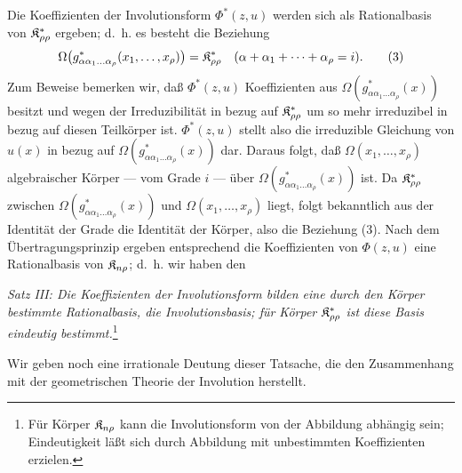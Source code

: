 Die Koeffizienten der Involutionsform $\Phi^*(z,u)$ werden sich als Rationalbasis von $\mathfrak{K}^*_{\rho\rho}$ ergeben; d.~h. es besteht die Beziehung
\begin{equation}
  \Omega\bigl(g^*_{\alpha\alpha_1\ldots\alpha_\rho}(x_1,
  \ldots,x_\rho)\bigr)=\mathfrak{K}^*_{\rho\rho}
  \quad(\alpha+\alpha_1+\cdots+\alpha_\rho=i).
\tag{3}
\end{equation}
Zum Beweise bemerken wir, daß $\Phi^*(z,u)$ Koeffizienten aus $\Omega(g^*_{\alpha\alpha_1\ldots\alpha_\rho}(x))$ besitzt und wegen der Irreduzibilität in bezug auf $\mathfrak{K}^*_{\rho\rho}$ um so mehr irreduzibel in bezug auf diesen Teilkörper ist. $\Phi^*(z,u)$ stellt also die irreduzible Gleichung von $u(x)$ in bezug auf $\Omega(g^*_{\alpha\alpha_1\ldots\alpha_\rho}(x))$ dar. Daraus folgt, daß $\Omega(x_1,
\ldots,x_\rho)$ algebraischer Körper --- vom Grade $i$ --- über $\Omega(g^*_{\alpha\alpha_1\ldots\alpha_\rho}(x))$ ist. Da $\mathfrak{K}^*_{\rho\rho}$ zwischen $\Omega(g^*_{\alpha\alpha_1\ldots\alpha_\rho}(x))$ und $\Omega(x_1,
\ldots,x_\rho)$ liegt, folgt bekanntlich aus der Identität der Grade die Identität der Körper, also die Beziehung (3). Nach dem Übertragungsprinzip ergeben entsprechend die Koeffizienten von $\Phi(z,u)$ eine Rationalbasis von $\mathfrak{K}_{n\rho}$; d.~h. wir haben den

\emph{Satz III: Die Koeffizienten der Involutionsform bilden eine durch den Körper bestimmte Rationalbasis, die Involutionsbasis; für Körper $\mathfrak{K}^*_{\rho\rho}$ ist diese Basis eindeutig bestimmt.}\footnote{Für Körper $\mathfrak{K}_{n\rho}$ kann die Involutionsform von der Abbildung abhängig sein; Eindeutigkeit läßt sich durch Abbildung mit unbestimmten Koeffizienten erzielen.}

Wir geben noch eine irrationale Deutung dieser Tatsache, die den Zusammenhang mit der geometrischen Theorie der Involution herstellt.

